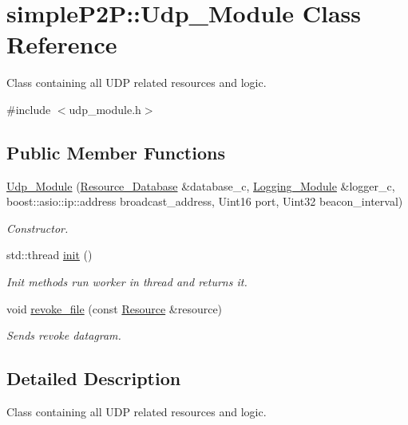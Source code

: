 \hypertarget{classsimpleP2P_1_1Udp__Module}{}\section{simple\+P2P\+:\+:Udp\+\_\+\+Module Class Reference}
\label{classsimpleP2P_1_1Udp__Module}


Class containing all U\+DP related resources and logic.  




{\ttfamily \#include $<$udp\+\_\+module.\+h$>$}

\subsection*{Public Member Functions}
\begin{DoxyCompactItemize}
\item 
\hyperlink{classsimpleP2P_1_1Udp__Module_aee2cb348598efb460fa566a858141fd3}{Udp\+\_\+\+Module} (\hyperlink{classsimpleP2P_1_1Resource__Database}{Resource\+\_\+\+Database} \&database\+\_\+c, \hyperlink{classsimpleP2P_1_1Logging__Module}{Logging\+\_\+\+Module} \&logger\+\_\+c, boost\+::asio\+::ip\+::address broadcast\+\_\+address, Uint16 port, Uint32 beacon\+\_\+interval)
\begin{DoxyCompactList}\small\item\em Constructor. \end{DoxyCompactList}\item 
std\+::thread \hyperlink{classsimpleP2P_1_1Udp__Module_a6e1598a38a557ebdf6eb4849b3cde9db}{init} ()
\begin{DoxyCompactList}\small\item\em Init methods run worker in thread and returns it. \end{DoxyCompactList}\item 
void \hyperlink{classsimpleP2P_1_1Udp__Module_ad3904b2be4e113a8f7be11b23cfde4d2}{revoke\+\_\+file} (const \hyperlink{classsimpleP2P_1_1Resource}{Resource} \&resource)
\begin{DoxyCompactList}\small\item\em Sends revoke datagram. \end{DoxyCompactList}\end{DoxyCompactItemize}


\subsection{Detailed Description}
Class containing all U\+DP related resources and logic. 

